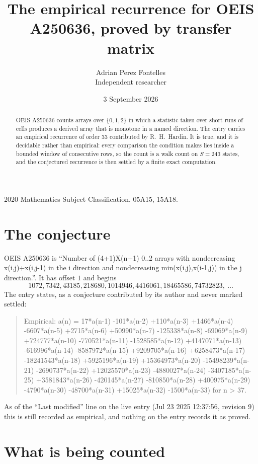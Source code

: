 \documentclass[11pt,a4paper]{article}
\title{The empirical recurrence for OEIS A250636, proved by transfer matrix}
\author{Adrian Perez Fontelles\\ \small Independent researcher}
\date{3 September 2026}
\theoremstyle{plain}
\theoremstyle{definition}
\begin{document}
\maketitle

\begin{abstract}
OEIS A250636 counts arrays over $\{0,1,2\}$ in which a statistic taken over short runs
of cells produces a derived array that is monotone in a named direction. The entry carries an
empirical recurrence of order $33$ contributed by R.~H.~Hardin. It is true, and it is
decidable rather than empirical: every comparison the condition makes lies inside a bounded
window of consecutive rows, so the count is a walk count on $S=243$ states, and the
conjectured recurrence is then settled by a finite exact computation.
\end{abstract}

\noindent\small 2020 Mathematics Subject Classification. 05A15, 15A18.\normalsize

\section{The conjecture}

OEIS A250636 is ``Number of (4+1)X(n+1) 0..2 arrays with nondecreasing x(i,j)+x(i,j-1) in the i direction and nondecreasing min(x(i,j),x(i-1,j)) in the j direction.''. It has offset $1$ and begins
\[
1072, 7342, 43185, 218680, 1014946, 4416061, 18465586, 74732823,\ \dots
\]
The entry states, as a conjecture contributed by its author and never marked settled:
\begin{quote}
Empirical: a(n) = 17*a(n-1) -101*a(n-2) +110*a(n-3) +1466*a(n-4) -6607*a(n-5) +2715*a(n-6) +50990*a(n-7) -125338*a(n-8) -69069*a(n-9) +724777*a(n-10) -770521*a(n-11) -1528585*a(n-12) +4147071*a(n-13) -616996*a(n-14) -8587972*a(n-15) +9209705*a(n-16) +6258473*a(n-17) -18241543*a(n-18) +5925196*a(n-19) +15364973*a(n-20) -15498239*a(n-21) -2690737*a(n-22) +12025570*a(n-23) -4880027*a(n-24) -3407185*a(n-25) +3581843*a(n-26) -420145*a(n-27) -810850*a(n-28) +400975*a(n-29) -4790*a(n-30) -48700*a(n-31) +15025*a(n-32) -1500*a(n-33) for n > 37.
\end{quote}
As of the ``Last modified'' line on the live entry (Jul 23 2025 12:37:56, revision 9) this is still
recorded as empirical, and nothing on the entry records it as proved.

\section{What is being counted}
\end{document}
